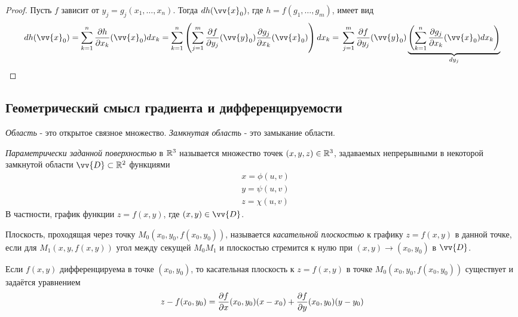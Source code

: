 \begin{proof}
	Пусть $f$ зависит от $y_j = g_j(x_1, \ldots, x_n)$. Тогда $dh(\vv{x}_0)$, где $h = f(g_1, \ldots, g_m)$, имеет вид
	\[
		dh(\vv{x}_0) = \suml_{k = 1}^n \frac{\vdelta h}{\vdelta x_k} (\vv{x}_0) dx_k = \suml_{k = 1}^n \left(\suml_{j = 1}^m \frac{\vdelta f}{\vdelta y_j} (\vv{y}_0) \frac{\vdelta g_j}{\vdelta x_k} (\vv{x}_0)\right) dx_k =
		\\
		\suml_{j = 1}^m \frac{\vdelta f}{\vdelta y_j} (\vv{y}_0) \underbrace{\left(\suml_{k = 1}^n \frac{\vdelta g_j}{\vdelta x_k} (\vv{x}_0) dx_k\right)}_{dy_j}
	\]
\end{proof}

\subsection{Геометрический смысл градиента и дифференцируемости}

\begin{definition}
	\textit{Область} - это открытое связное множество. \textit{Замкнутая область} - это замыкание области.
\end{definition}

\begin{definition}
	\textit{Параметрически заданной поверхностью} в $\mathbb{R}^3$ называется множество точек $(x, y, z) \in \mathbb{R}^3$, задаваемых непрерывными в некоторой замкнутой области $\vv{D} \subset \R^2$ функциями
	\begin{align*}
		&{x = \phi(u, v)}
		\\
		&{y = \psi(u, v)}
		\\
		&{z = \chi(u, v)}
	\end{align*}
	В частности, график функции $z = f(x, y)$, где $(x, y) \in \vv{D}$.
\end{definition}

\begin{definition}
	Плоскость, проходящая через точку $M_0(x_0, y_0, f(x_0, y_0))$, называется \textit{касательной плоскостью} к графику $z = f(x, y)$ в данной точке, если для $M_1(x, y, f(x, y))$ угол между секущей $M_0 M_1$ и плоскостью стремится к нулю при $(x, y) \to (x_0, y_0)$ в $\vv{D}$.
\end{definition}


\begin{theorem}
	Если $f(x, y)$ дифференцируема в точке $(x_0, y_0)$, то касательная плоскость к $z = f(x, y)$ в точке $M_0(x_0, y_0, f(x_0, y_0))$ существует и задаётся уравнением
	\[
		z - f(x_0, y_0) = \frac{\partial f}{\partial x} (x_0, y_0) (x - x_0) + \frac{\partial f}{\partial y} (x_0, y_0) (y - y_0)
	\]
\end{theorem}

